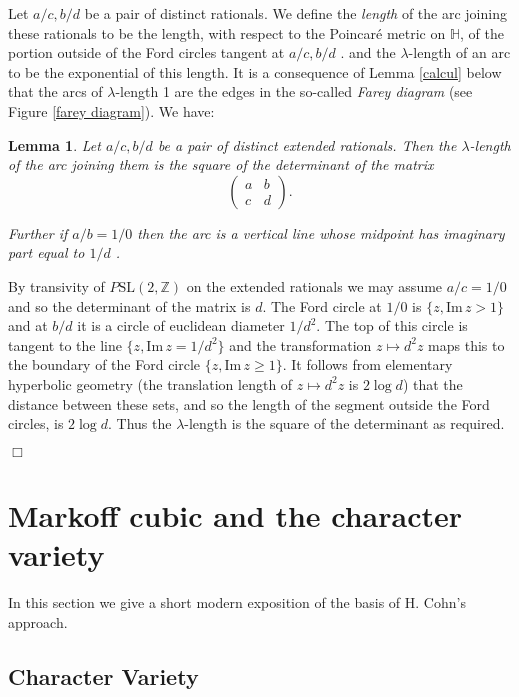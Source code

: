 \documentclass[12pt,a4paper]{amsart}
\newtheorem{lem}[thm]{Lemma}
\def\HH{\mathbb{H}}
\def\im{\mathrm{Im}\,}
\def\ZZ{\mathbb{Z}}
\def\sl2{\mathrm{SL}(2, \ZZ)}
\begin{document}
Let $a/c, b/d$ be a pair of distinct rationals. We define the \textit{length}
of the arc joining these rationals to be the length, with respect to the
Poincar\'e metric on $\HH$, of the portion  outside of the Ford circles tangent
at $a/c, b/d$ . and the $\lambda$-length of an arc to be the exponential of
this length. It is a consequence  of Lemma \ref{calcul} below  that the arcs of
$\lambda$-length 1 are the edges in the so-called \textit{Farey diagram} (see
Figure \ref{farey diagram}). We have:

\begin{lem}\label{determinant}
Let $a/c, b/d$ be a pair of distinct extended rationals.
Then the  $\lambda$-length of the arc joining them
 is the square of the determinant of the matrix
$$\begin{pmatrix}
a & b \\ c & d
\end{pmatrix}.$$

Further if $a/b = 1/0$ then the arc is a vertical line 
 whose midpoint has imaginary part equal to $1/d$ .
\end{lem}

\proof By transivity of $P\sl2$ on the extended rationals we may assume $a/c =
1/0$ and so the determinant of the matrix is $d$. The Ford circle at $1/0$  is
$\{ z, \im z > 1\}$ and at $b/d$ it is a circle of euclidean diameter $1/d^2$.
The top of this circle is tangent to the line $\{ z, \im z = 1/d^2\}$ and the
transformation $z \mapsto d^2 z $ maps this to the boundary of the Ford circle
$\{ z, \im z \geq 1\}$. It follows from elementary hyperbolic geometry (the
translation length of $z \mapsto d^2 z$ is $2\log d$) that the distance between
these sets, and so the length of the segment outside the Ford circles, is
$2\log d$. Thus the $\lambda$-length is the square of the determinant as
required.

\hfill $\Box$

 
\section{Markoff cubic and the character variety}

In this section we give a short modern exposition of the basis of H. Cohn's
approach.

\subsection{Character Variety}
\end{document}
